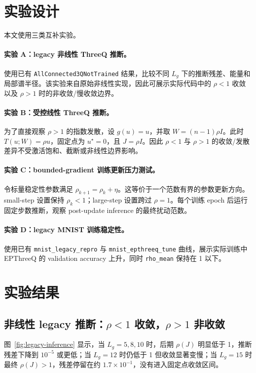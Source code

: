 \documentclass[UTF8,zihao=-4]{ctexart}
\begin{document}
\section{实验设计}

本文使用三类互补实验。

\paragraph{实验 A：legacy 非线性 ThreeQ 推断。}
使用已有 \texttt{AllConnected3QNotTrained} 结果，比较不同 $L_g$ 下的推断残差、能量和局部谱半径。该实验来自原始非线性实现，因此可展示实际代码中的 $\rho<1$ 收敛以及 $\rho>1$ 时的非收敛/慢收敛边界。

\paragraph{实验 B：受控线性 ThreeQ 推断。}
为了直接观察 $\rho>1$ 的指数发散，设 $g(u)=u$，并取 $W=(n-1)\rho I$。此时 $T(u;W)=\rho u$，固定点为 $u^\star=0$，且 $J=\rho I$。因此 $\rho<1$ 与 $\rho>1$ 的收敛/发散差异不受激活饱和、截断或非线性边界影响。

\paragraph{实验 C：bounded-gradient 训练更新压力测试。}
令标量稳定性参数满足 $\rho_{k+1}=\rho_k+\eta$。这等价于一个范数有界的参数更新方向。small-step 设置保持 $\rho_k<1$；large-step 设置跨过 $\rho=1$。每个训练 epoch 后运行固定步数推断，观察 post-update inference 的最终扰动范数。

\paragraph{实验 D：legacy MNIST 训练稳定性。}
使用已有 \texttt{mnist\_legacy\_repro} 与 \texttt{mnist\_epthreeq\_tune} 曲线，展示实际训练中 EPThreeQ 的 validation accuracy 上升，同时 \texttt{rho\_mean} 保持在 1 以下。

\section{实验结果}

\subsection{非线性 legacy 推断：$\rho<1$ 收敛，$\rho>1$ 非收敛}

图~\ref{fig:legacy-inference} 显示，当 $L_g=5,8,10$ 时，后期 $\rho(J)$ 明显低于 1，推断残差下降到 $10^{-5}$ 或更低；当 $L_g=12$ 时仍低于 1 但收敛显著变慢；当 $L_g=15$ 时最终 $\rho(J)>1$，残差停留在约 $1.7\times10^{-1}$，没有进入固定点收敛区间。
\end{document}
